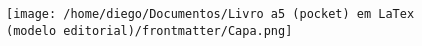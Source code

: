 \pagestyle{empty}

\thispagestyle{empty}

\begin{figure}[p]
	\centering
	\texttt{[image: /home/diego/Documentos/Livro a5 (pocket) em LaTex (modelo editorial)/frontmatter/Capa.png]}
\end{figure}

\restoregeometry %
\cleardoublepage




